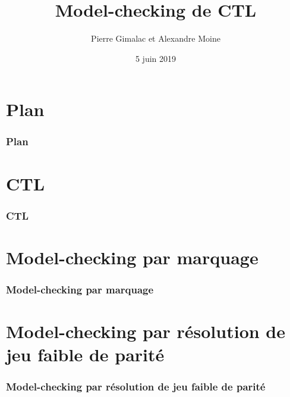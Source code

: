 \documentclass[11pt]{beamer}
\begin{document}
\author{Pierre Gimalac et Alexandre Moine}
\title{Model-checking de CTL}
\date{5 juin 2019}

\begin{frame}[plain]
	\maketitle
\end{frame}

\section{Plan}

\begin{frame}
	\frametitle{Plan}
	\tableofcontents
\end{frame}

\section{CTL}
\begin{frame}
	\frametitle{CTL}
\end{frame}

\section{Model-checking par marquage}
\begin{frame}
	\frametitle{Model-checking par marquage}
\end{frame}


\section{Model-checking par résolution de jeu faible de parité}
\begin{frame}
	\frametitle{Model-checking par résolution de jeu faible de parité}
\end{frame}
\end{document}
